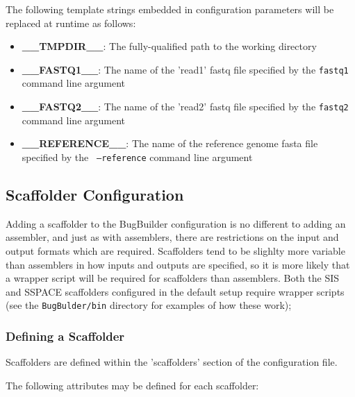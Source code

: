 \documentclass[a4paper,10pt]{article}
\begin{document}
The following template strings embedded in configuration parameters will be replaced at runtime as
follows:

\begin{itemize}
\item {\bf \_\_TMPDIR\_\_}: The fully-qualified path to the working directory
\item {\bf \_\_FASTQ1\_\_}: The name of the 'read1' fastq file specified by the {\tt fastq1}
command line argument
\item {\bf \_\_FASTQ2\_\_}: The name of the 'read2' fastq file specified by the {\tt fastq2}
command line argument
\item {\bf \_\_REFERENCE\_\_}: The name of the reference genome fasta file specified by the {\tt
--reference} command line argument
\end{itemize}

\subsection{Scaffolder Configuration}

Adding a scaffolder to the BugBuilder configuration is no different to adding an assembler, and
just as with assemblers, there are restrictions on the input and output formats which are required.
Scaffolders tend to be slighlty more variable than assemblers in how inputs and outputs are
specified, so it is more likely that a wrapper script will be required for scaffolders than
assemblers. Both the SIS and SSPACE scaffolders configured in the default setup require wrapper
scripts (see the {\tt BugBulder/bin} directory for examples of how these work);

\subsubsection{Defining a Scaffolder}

Scaffolders are defined within the 'scaffolders' section of the configuration file. 

The following attributes may be defined for each scaffolder:
\end{document}
